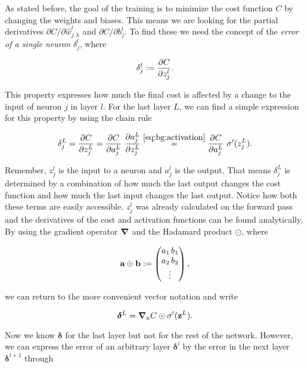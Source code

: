 \indent
As stated before, the goal of the training is to minimize the cost function $C$ by changing the weights and biases. This means we are looking for the partial derivatives $\partial C / \partial \hat w^l_{j,k}$ and
$\partial C / \partial b^l_j$. To find these we need the concept of the \textit{error of a single neuron} $\delta^l_j$, where

\begin{equation} 
    \delta^l_j := \pdv{C}{z^l_j}.
\end{equation}

This property expresses how much the final cost is affected by a change to the input of neuron $j$ in layer $l$. For the last layer $L$, we can find a simple expression for this property by using the chain rule

\begin{equation} \label{eq:bg:back_prop}
    \delta^L_j = \pdv{C}{z^L_j} = \pdv{C}{a^L_j} \ \pdv{a^L_j}{z^L_j}
    \stackrel{\eqref{eq:bg:activation}}{=}
    \pdv{C}{a^L_j} \ \sigma'(z^L_j).
\end{equation}

Remember, $z^l_j$ is the input to a neuron and $a^l_j$ is the output. That means $\delta^L_j$ is determined by a combination of how much the last output changes the cost function and how much the last input changes the last output. Notice how both these terms are easily accessible. $z^l_j$ was already calculated on the forward pass and the derivatives of the cost and activation functions can be found analytically. By using the gradient operator $\grad$ and the Hadamard product $\odot$, where

\begin{equation}
    \vb a \odot \vb b :=
    \begin{pmatrix}
        a_1 \, b_1 \\
        a_2 \, b_2 \\
        \vdots
    \end{pmatrix},
\end{equation}

we can return to the more convenient vector notation and write

\begin{equation} \label{eq:bg:back1}
    \boldsymbol \delta^L = \grad_a C  \odot \sigma'(\vb z^L).
\end{equation}

Now we know $\boldsymbol \delta$ for the last layer but not for the rest of the network. However, we can express the error of an arbitrary layer $\boldsymbol \delta^l$ by the error in the next layer $\boldsymbol \delta^{l+1}$ through

